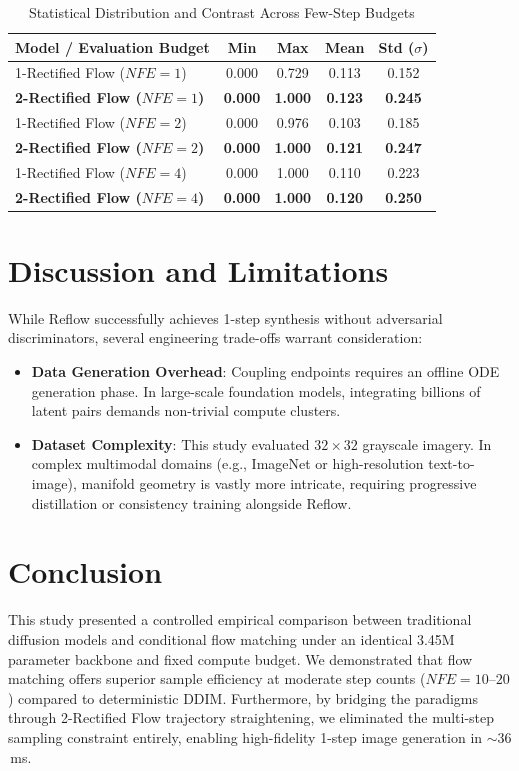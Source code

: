 \documentclass[conference]{IEEEtran}
\begin{document}
\begin{table}[h]
\caption{Statistical Distribution and Contrast Across Few-Step Budgets}
\label{tab:pixel_stats}
\centering
\begin{tabular}{lcccc}
\toprule
\textbf{Model / Evaluation Budget} & \textbf{Min} & \textbf{Max} & \textbf{Mean} & \textbf{Std ($\sigma$)} \\
\midrule
1-Rectified Flow ($NFE = 1$) & 0.000 & 0.729 & 0.113 & 0.152 \\
\textbf{2-Rectified Flow ($NFE = 1$)} & \textbf{0.000} & \textbf{1.000} & \textbf{0.123} & \textbf{0.245} \\
1-Rectified Flow ($NFE = 2$) & 0.000 & 0.976 & 0.103 & 0.185 \\
\textbf{2-Rectified Flow ($NFE = 2$)} & \textbf{0.000} & \textbf{1.000} & \textbf{0.121} & \textbf{0.247} \\
1-Rectified Flow ($NFE = 4$) & 0.000 & 1.000 & 0.110 & 0.223 \\
\textbf{2-Rectified Flow ($NFE = 4$)} & \textbf{0.000} & \textbf{1.000} & \textbf{0.120} & \textbf{0.250} \\
\bottomrule
\end{tabular}
\end{table}

\section{Discussion and Limitations}
While Reflow successfully achieves 1-step synthesis without adversarial discriminators, several engineering trade-offs warrant consideration:
\begin{itemize}
    \item \textbf{Data Generation Overhead}: Coupling endpoints requires an offline ODE generation phase. In large-scale foundation models, integrating billions of latent pairs demands non-trivial compute clusters.
    \item \textbf{Dataset Complexity}: This study evaluated $32 \times 32$ grayscale imagery. In complex multimodal domains (e.g., ImageNet or high-resolution text-to-image), manifold geometry is vastly more intricate, requiring progressive distillation \cite{salimans2022progressive} or consistency training \cite{song2023consistency} alongside Reflow.
\end{itemize}

\section{Conclusion}
This study presented a controlled empirical comparison between traditional diffusion models and conditional flow matching under an identical 3.45M parameter backbone and fixed compute budget. We demonstrated that flow matching offers superior sample efficiency at moderate step counts ($NFE = 10\text{--}20$) compared to deterministic DDIM. Furthermore, by bridging the paradigms through 2-Rectified Flow trajectory straightening, we eliminated the multi-step sampling constraint entirely, enabling high-fidelity 1-step image generation in $\sim 36$\,ms.
\end{document}
